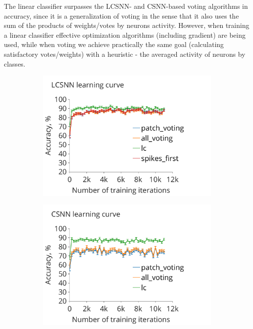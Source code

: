 \documentclass[a4paper,10pt]{article}
\begin{document}
The linear classifier surpasses the LCSNN- and CSNN-based voting algorithms in accuracy, since it is a generalization of voting in the sense that it also uses the sum of the products of weights/votes by neurons activity. However, when training a linear classifier effective optimization algorithms (including gradient) are being used, while when voting we achieve practically the same goal (calculating satisfactory votes/weights) with a heuristic - the averaged activity of neurons by classes.

\begin{figure}
\begin{subfigure}{0.49\textwidth}
    \includegraphics[width=\textwidth,keepaspectratio=true]{LCSNN_learning_rate.pdf}
 \caption{}
 \label{LCSNN_learning_curve}
\end{subfigure}
\begin{subfigure}{0.49\textwidth} 
    \includegraphics[width=\textwidth,keepaspectratio=true]{CSNN_learning_rate.pdf}

\end{subfigure}
\end{figure}
\end{document}
